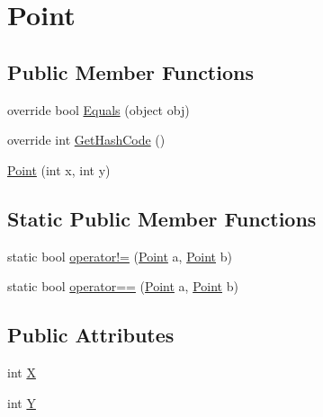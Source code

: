 \hypertarget{structMicrosoft_1_1Xna_1_1Framework_1_1Point}{}\section{Point}
\label{structMicrosoft_1_1Xna_1_1Framework_1_1Point}
\subsection*{Public Member Functions}
\begin{DoxyCompactItemize}
\item 
override bool \hyperlink{structMicrosoft_1_1Xna_1_1Framework_1_1Point_aadf763f0213fc2f3875230b06bb0b6cf}{Equals} (object obj)
\item 
override int \hyperlink{structMicrosoft_1_1Xna_1_1Framework_1_1Point_a77e1afa2b6dee1ed3640da81d7407b42}{Get\+Hash\+Code} ()
\item 
\hyperlink{structMicrosoft_1_1Xna_1_1Framework_1_1Point_a6773b78ca9523d4d482ac886b41a1bfc}{Point} (int x, int y)
\end{DoxyCompactItemize}
\subsection*{Static Public Member Functions}
\begin{DoxyCompactItemize}
\item 
static bool \hyperlink{structMicrosoft_1_1Xna_1_1Framework_1_1Point_a6d88370f1ad63aefbe50cad9b6c3cfae}{operator!=} (\hyperlink{structMicrosoft_1_1Xna_1_1Framework_1_1Point}{Point} a, \hyperlink{structMicrosoft_1_1Xna_1_1Framework_1_1Point}{Point} b)
\item 
static bool \hyperlink{structMicrosoft_1_1Xna_1_1Framework_1_1Point_a1b24fa11ba170b8c4f264e75ef439cf2}{operator==} (\hyperlink{structMicrosoft_1_1Xna_1_1Framework_1_1Point}{Point} a, \hyperlink{structMicrosoft_1_1Xna_1_1Framework_1_1Point}{Point} b)
\end{DoxyCompactItemize}
\subsection*{Public Attributes}
\begin{DoxyCompactItemize}
\item 
int \hyperlink{structMicrosoft_1_1Xna_1_1Framework_1_1Point_a80c0944640e62d3ed6c5419c1bcc0c88}{X}
\item 
int \hyperlink{structMicrosoft_1_1Xna_1_1Framework_1_1Point_aa482c4cc86a24474e4fb19b5b5978778}{Y}
\end{DoxyCompactItemize}
